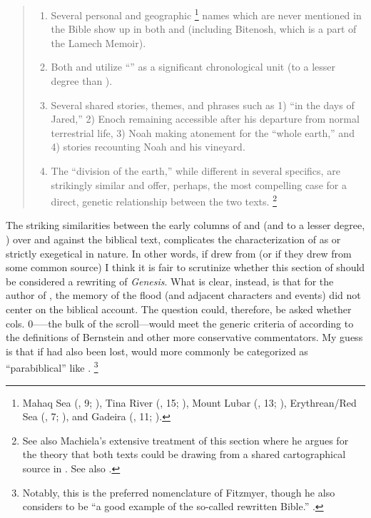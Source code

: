 \begin{quote}
\begin{enumerate}
    \item Several personal and geographic%
            \footnote{Mahaq Sea (, 9; ), Tina River (, 15; ), Mount Lubar (, 13; ), Erythrean/Red Sea (, 7; ), and Gadeira (, 11; ).}
        names which are never mentioned in the Bible show up in both \ga and \jub (including Bitenosh, which is a part of the Lamech Memoir).
    \item Both \jub and \ga utilize ``\jub'' as a significant chronological unit (\ga to a lesser degree than \jub).
    \item Several shared stories, themes, and phrases such as 1) ``in the days of Jared,'' 2) Enoch remaining accessible after his departure from normal terrestrial life, 3) Noah making atonement for the ``whole earth,'' and 4) stories recounting Noah and his vineyard.
    \item The ``division of the earth,'' while different in several specifics, are strikingly similar and offer, perhaps, the most compelling case for a direct, genetic relationship between the two texts.%
        \footnote{See also Machiela's extensive treatment of this section where he argues for the theory that both texts could be drawing from a shared cartographical source in \cite*[105--130]{machiela2009}. See also \cite{alexander_jjs1982}.}
\end{enumerate}
\end{quote}

The striking similarities between the early columns of \ga and \jub (and to a lesser degree, \firstenoch) over and against the biblical text, complicates the characterization of \ga as \rwb or strictly exegetical in nature. In other words, if \ga drew from \jub (or if they drew from some common source) I think it is fair to scrutinize whether this section of \ga should be considered a rewriting of \emph{Genesis}. What is clear, instead, is that for the author of \ga, the memory of the flood (and adjacent characters and events) did not center on the biblical account. The question could, therefore, be asked whether cols. 0-----the bulk of the scroll---would meet the generic criteria of \rwb according to the definitions of Bernstein and other more conservative commentators. My guess is that if  had also been lost, \ga would more commonly be categorized as ``parabiblical'' like \firstenoch.%
    \footnote{Notably, this is the preferred nomenclature of Fitzmyer, though he also considers \ga to be ``a good example of the so-called rewritten Bible.'' \cite[20]{fitzmyer2004}.}

